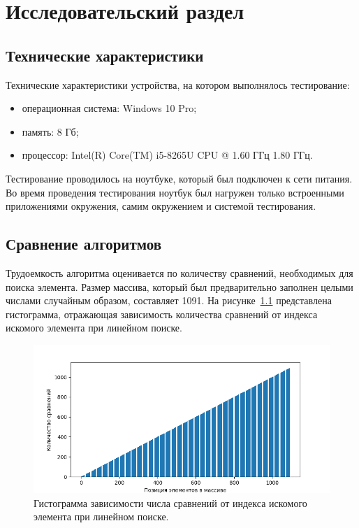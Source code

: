\chapter{Исследовательский раздел}
\section{Технические характеристики}
Технические характеристики устройства, на котором выполнялось тестирование:
\begin{itemize}
	\item операционная система: Windows 10 Pro;
	\item память: 8 Гб;
	\item процессор: Intel(R) Core(TM) i5-8265U CPU @ 1.60 ГГц   1.80 ГГц.
\end{itemize}
Тестирование проводилось на ноутбуке, который был подключен к сети питания. Во время проведения тестирования ноутбук был нагружен только встроенными приложениями окружения, самим окружением и системой тестирования.

\section{Сравнение алгоритмов}
Трудоемкость алгоритма оценивается по количеству сравнений, необходимых для поиска элемента. Размер массива, который был предварительно заполнен целыми числами случайным образом, составляет 1091. На рисунке~\ref{fig:Figure_1} представлена гистограмма, отражающая зависимость количества сравнений от индекса искомого элемента при линейном поиске.
\begin{figure}[H]
    \centering
    \includegraphics[width=1\textwidth]{images/Figure_1.png}
    \caption{Гистограмма зависимости числа сравнений от индекса искомого элемента при линейном поиске.}
    \label{fig:Figure_1}
\end{figure}

